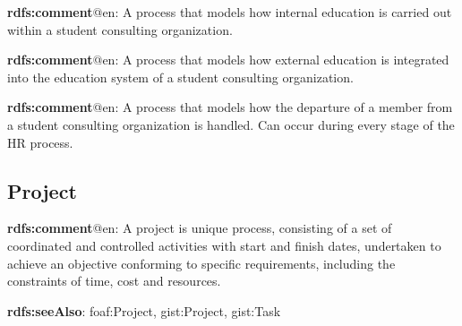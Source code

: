 \documentclass[a4paper, DIV=13, BCOR=0cm]{scrbook}
\begin{document}
\begin{mdframed}[style=onto-4, frametitle={Internal Education Process}]
	{%
		\begin{compactitem}
			\item \textbf{rdfs:comment}@en: A process that models how internal education is carried out within a student consulting organization.
		\end{compactitem}
	} %
\end{mdframed}

\begin{mdframed}[style=onto-4, frametitle={External Education Process}]
	{%
		\begin{compactitem}
			\item \textbf{rdfs:comment}@en: A process that models how external education is integrated into the education system of a student consulting organization.
		\end{compactitem}
	} %
\end{mdframed}

\begin{mdframed}[style=onto-2, frametitle={Offboarding Process}]
	{%
		\begin{compactitem}
			\item \textbf{rdfs:comment}@en: A process that models how the departure of a member from a student consulting organization is handled. Can occur during every stage of the HR process.
		\end{compactitem}
	} %
\end{mdframed}

\subsection{Project}
\begin{mdframed}[style=onto, frametitle={Project}]
	{%
		\begin{compactitem}
			\item \textbf{rdfs:comment}@en: A project is unique process, consisting of a set of coordinated and controlled activities with start and finish dates, undertaken to achieve an objective conforming to specific requirements, including the constraints of time, cost and resources. \cite{iso-9000-2015}
			\item \textbf{rdfs:seeAlso}: foaf:Project, gist:Project, gist:Task
		\end{compactitem}
	} %
\end{mdframed}
\end{document}
